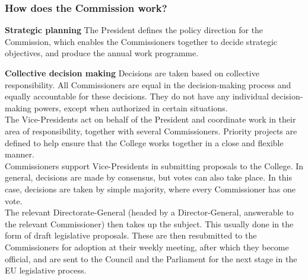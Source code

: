 \subsubsection{How does the Commission work?}
\textbf{Strategic planning}
The President defines the policy direction for the Commission, which enables the Commissioners together to decide strategic objectives, and produce the annual work programme.

\textbf{Collective decision making}
Decisions are taken based on collective responsibility. All Commissioners are equal in the decision-making process and equally accountable for these decisions. They do not have any individual decision-making powers, except when authorized in certain situations.
\\

The Vice-Presidents act on behalf of the President and coordinate work in their area of responsibility, together with several Commissioners. Priority projects are defined to help ensure that the College works together in a close and flexible manner.
\\

Commissioners support Vice-Presidents in submitting proposals to the College. In general, decisions are made by consensus, but votes can also take place. In this case, decisions are taken by simple majority, where every Commissioner has one vote.
\\

The relevant Directorate-General (headed by a Director-General, answerable to the relevant Commissioner) then takes up the subject. This usually done in the form of draft legislative proposals.
These are then resubmitted to the Commissioners for adoption at their weekly meeting, after which they become official, and are sent to the Council and the Parliament for the next stage in the EU legislative process.
\clearpage














